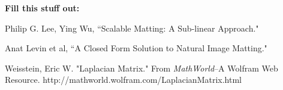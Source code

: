 \textbf{Fill this stuff out:}

\begin{thebibliography}{9}
	Philip G. Lee, Ying Wu,
	``Scalable Matting: A Sub-linear Approach."
	
	Anat Levin et al,
	``A Closed Form Solution to Natural Image Matting."
	
	 Weisstein, Eric W. "Laplacian Matrix." From 	\textit{MathWorld}--A Wolfram Web Resource. http://mathworld.wolfram.com/LaplacianMatrix.html 

\end{thebibliography}